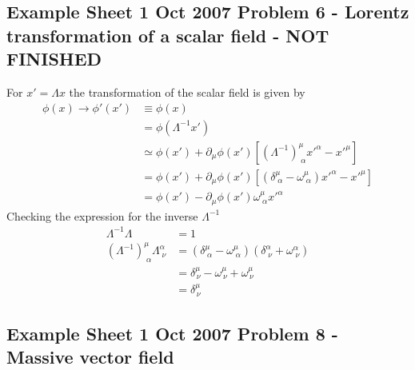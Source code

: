 \documentclass[10pt,a4paper]{book}
\theoremstyle{definition}
\begin{document}
\subsection{Example Sheet 1 Oct 2007 Problem 6 - Lorentz transformation of a scalar field - NOT FINISHED}
For $x'=\Lambda x$ the transformation of the scalar field is given by
\begin{align}
\phi(x)\rightarrow\phi'(x')
&\equiv\phi(x)\\
&=\phi(\Lambda^{-1}x')\\
&\simeq\phi(x')+\partial_\mu\phi(x')[(\Lambda^{-1})^\mu_{\;\alpha}x'^\alpha-x'^\mu]\\
&=\phi(x')+\partial_\mu\phi(x')[(\delta^\mu_{\;\alpha}-\omega^\mu_{\;\alpha})x'^\alpha-x'^\mu]\\
&=\phi(x')-\partial_\mu\phi(x')\omega^\mu_{\;\alpha}x'^\alpha
\end{align}
Checking the expression for the inverse $\Lambda^{-1}$
\begin{align}
\Lambda^{-1}\Lambda&=1\\
(\Lambda^{-1})^\mu_{\;\alpha}\Lambda^\alpha_{\;\nu}&=(\delta^\mu_{\;\alpha}-\omega^\mu_{\;\alpha})(\delta^\alpha_{\;\nu}+\omega^\alpha_{\;\nu})\\
&=\delta^\mu_{\,\nu}-\omega^\mu_{\,\nu}+\omega^\mu_{\,\nu}\\
&=\delta^\mu_{\,\nu}
\end{align}

\subsection{Example Sheet 1 Oct 2007 Problem 8 - Massive vector field}
\end{document}
